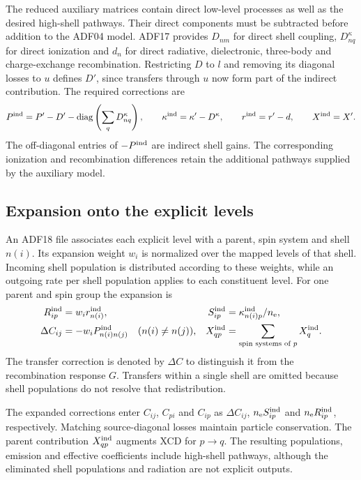 \documentclass[11pt,a4paper]{article}
\newcommand{\code}[1]{\texttt{\detokenize{#1}}}
\newcommand{\nelec}{n_{\mathrm e}}
\numberwithin{equation}{section}
\begin{document}
The reduced auxiliary matrices contain direct low-level processes as
well as the desired high-shell pathways. Their direct components
must be subtracted before addition to the ADF04 model. ADF17 provides
$D_{nm}$ for direct shell coupling, $D^{\kappa}_{nq}$ for direct
ionization and $d_n$ for direct radiative, dielectronic, three-body
and charge-exchange recombination. Restricting $D$ to $l$ and
removing its diagonal losses to $u$ defines $D'$, since transfers
through $u$ now form part of the indirect contribution. The required
corrections are
\begin{equation}
 P^{\rm ind}=P'-D'-\operatorname{diag}\left(\sum_qD^{\kappa}_{nq}\right),\qquad
 \kappa^{\rm ind}=\kappa'-D^{\kappa},\qquad
 r^{\rm ind}=r'-d,\qquad X^{\rm ind}=X'.
\end{equation}
The off-diagonal entries of $-P^{\rm ind}$ are indirect shell gains.
The corresponding ionization and recombination differences retain
the additional pathways supplied by the auxiliary model.

\subsection{Expansion onto the explicit levels}

An ADF18 \code{a17_p208} file associates each explicit level with a
parent, spin system and shell $n(i)$. Its expansion weight $w_i$ is
normalized over the mapped levels of that shell. Incoming shell
population is distributed according to these weights, while an
outgoing rate per shell population applies to each constituent level.
For one parent and spin group the expansion is
\begin{align}
 R^{\rm ind}_{ip}&=w_i r^{\rm ind}_{n(i)}, &
 S^{\rm ind}_{ip}&=\kappa^{\rm ind}_{n(i)p}/\nelec,\\
 \Delta C_{ij}&=-w_i P^{\rm ind}_{n(i)n(j)}\quad(n(i)\ne n(j)), &
 X^{\rm ind}_{qp}&=\sum_{\text{spin systems of }p}X^{\rm ind}_q.\label{eq:expansion}
\end{align}
The transfer correction is denoted by $\Delta C$ to distinguish it
from the recombination response $G$. Transfers within a single shell
are omitted because shell populations do not resolve that
redistribution.

The expanded corrections enter $C_{ij}$, $C_{pi}$ and $C_{ip}$ as
$\Delta C_{ij}$, $\nelec S^{\rm ind}_{ip}$ and
$\nelec R^{\rm ind}_{ip}$, respectively. Matching source-diagonal
losses maintain particle conservation. The parent contribution
$X^{\rm ind}_{qp}$ augments XCD for $p\to q$. The resulting
populations, emission and effective coefficients include high-shell
pathways, although the eliminated shell populations and radiation
are not explicit outputs.
\end{document}
